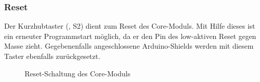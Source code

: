 \subsubsection{Reset}
Der Kurzhubtaster (, S2) dient zum Reset des \gls{Core-Modul}s. Mit Hilfe dieses ist ein erneuter Programmstart möglich, da er den Pin des low-aktiven Reset gegen Masse zieht. Gegebenenfalls angeschlossene Arduino-Shields werden mit diesem Taster ebenfalls zurückgesetzt.

\begin{figure}[htb]
    \centering
    \qquad
    \qquad
    \caption[Reset-Schaltung des Core-Moduls]{Reset-Schaltung des \gls{Core-Modul}s}
    \label{fig:coremodul-reset}
\end{figure}

